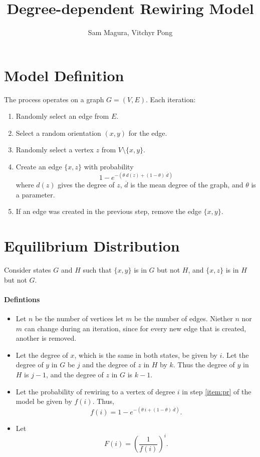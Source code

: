 \documentclass[a4paper,10pt]{article}
\title{Degree-dependent Rewiring Model}
\author{Sam Magura, Vitchyr Pong}
\begin{document}
\maketitle

\section{Model Definition}

The process operates on a graph $G = (V, E)$. Each iteration:

\begin{enumerate}
 \item Randomly select an edge from $E$. 
 \item Select a random orientation $(x, y)$ for the edge.
 \item \label{item:z} Randomly select a vertex $z$ from $V \setminus \{x, y\}$.
 \item \label{item:pr} Create an edge $\{x, z\}$ with probability
\begin{equation}
1 - e^{-(\theta \: d(z) + (1 - \theta) \: \overline{d})}
\end{equation}
where $d(z)$ gives the degree of $z$, $\overline{d}$ is the mean degree of the graph, and $\theta$ is a parameter.
 \item If an edge was created in the previous step, remove the edge $\{x, y\}$.
\end{enumerate}

\section{Equilibrium Distribution}
Consider states $G$ and $H$ such that $\{x, y\}$ is in $G$ but not $H$, and $\{x, z\}$ is in $H$ but not $G$. 

\paragraph{Defintions} 
\begin{itemize}
 \item Let $n$ be the number of vertices let $m$ be the number of edges. Niether $n$ nor $m$ can change during an iteration, since for every new edge that is created, another is removed.
 \item  Let the degree of $x$, which is the same in both states, be given by $i$. Let the degree of $y$ in $G$ be $j$ and the degree of $z$ in $H$ by $k$. Thus the degree of $y$ in $H$ is $j - 1$, and the degree of $z$ in $G$ is $k - 1$.
 \item Let the probability of rewiring to a vertex of degree $i$ in step \ref{item:pr} of the model be given by $f(i)$. Thus,
\begin{equation}
 f(i) = 1 - e^{-(\theta \: i + (1 - \theta) \: \overline{d})}.
\end{equation}
 \item Let
 \begin{equation}
  F(i) = \left(\frac{1}{f(i)}\right)^i.
 \end{equation}

\end{itemize}
\end{document}
